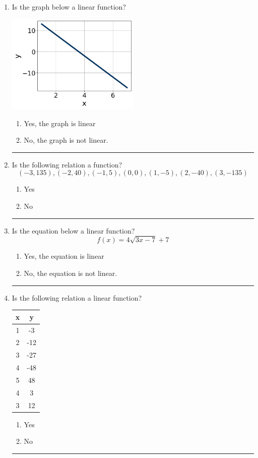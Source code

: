 \documentclass[14pt]{extbook}
\newcommand{\litem}[1]{\item#1\hspace*{-1cm}\rule{\textwidth}{0.4pt}}
\begin{document}
\begin{enumerate}
{\begin{enumerate}[label=\Alph*.]
\end{enumerate} }
\litem{
Is the graph below a linear function?
\begin{center}
    \includegraphics[width=0.5\textwidth]{../Figures/MA_8_F_1_2_graphB.png}
\end{center}
\begin{enumerate}[label=\Alph*.]
\item Yes, the graph is linear
\item No, the graph is not linear.

\end{enumerate} }
\litem{
Is the following relation a function?\[ (-3, 135), (-2, 40), (-1, 5), (0, 0), (1, -5), (2, -40), (3, -135) \]\begin{enumerate}[label=\Alph*.]
\item Yes
\item No

\end{enumerate} }
\litem{
Is the equation below a linear function?\[ f(x) = {4}\sqrt{3x -7}+7 \]\begin{enumerate}[label=\Alph*.]
\item Yes, the equation is linear
\item No, the equation is not linear.

\end{enumerate} }
\litem{
Is the following relation a linear function?

\begin{tabular}{c|c}
x &y\tabularnewline \hline
1 &-3\tabularnewline \hline
2 &-12\tabularnewline \hline
3 &-27\tabularnewline \hline
4 &-48\tabularnewline \hline
5 &48\tabularnewline \hline
4 &3\tabularnewline \hline
3 &12\end{tabular}\begin{enumerate}[label=\Alph*.]
\item Yes
\item No


\end{enumerate}}
\end{enumerate}
\end{document}
